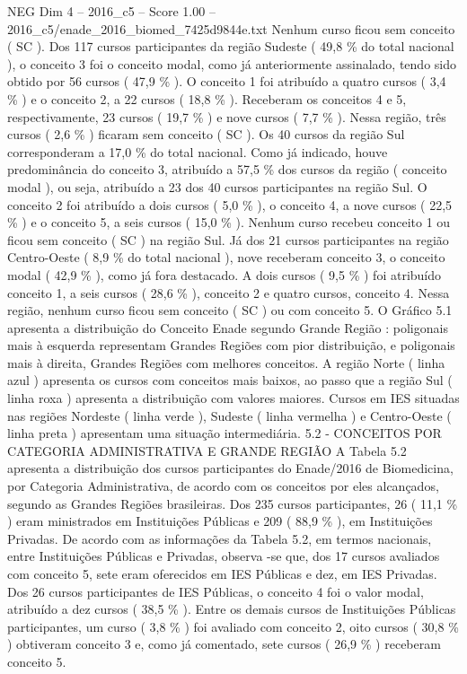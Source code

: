 \begin{textsample}{NEG Dim 4 – 2016\_c5 – Score 1.00 – 2016\_c5/enade\_2016\_biomed\_7425d9844e.txt}
Nenhum curso ficou sem conceito ( SC ).
Dos 117 cursos participantes da região Sudeste ( 49,8 \% do total nacional ), o conceito 3 foi o conceito modal, como já anteriormente assinalado, tendo sido obtido por 56 cursos ( 47,9 \% ).
O conceito 1 foi atribuído a quatro cursos ( 3,4 \% ) e o conceito 2, a 22 cursos ( 18,8 \% ).
Receberam os conceitos 4 e 5, respectivamente, 23 cursos ( 19,7 \% ) e nove cursos ( 7,7 \% ).
Nessa região, três cursos ( 2,6 \% ) ficaram sem conceito ( SC ).
Os 40 cursos da região Sul corresponderam a 17,0 \% do total nacional.
Como já indicado, houve predominância do conceito 3, atribuído a 57,5 \% dos cursos da região ( conceito modal ), ou seja, atribuído a 23 dos 40 cursos participantes na região Sul.
O conceito 2 foi atribuído a dois cursos ( 5,0 \% ), o conceito 4, a nove cursos ( 22,5 \% ) e o conceito 5, a seis cursos ( 15,0 \% ).
Nenhum curso recebeu conceito 1 ou ficou sem conceito ( SC ) na região Sul.
Já dos 21 cursos participantes na região Centro-Oeste ( 8,9 \% do total nacional ), nove receberam conceito 3, o conceito modal ( 42,9 \% ), como já fora destacado.
A dois cursos ( 9,5 \% ) foi atribuído conceito 1, a seis cursos ( 28,6 \% ), conceito 2 e quatro cursos, conceito 4.
Nessa região, nenhum curso ficou sem conceito ( SC ) ou com conceito 5.
O Gráfico 5.1 apresenta a distribuição do Conceito Enade segundo Grande Região : poligonais mais à esquerda representam Grandes Regiões com pior distribuição, e poligonais mais à direita, Grandes Regiões com melhores conceitos.
A região Norte ( linha azul ) apresenta os cursos com conceitos mais baixos, ao passo que a região Sul ( linha roxa ) apresenta a distribuição com valores maiores.
Cursos em IES situadas nas regiões Nordeste ( linha verde ), Sudeste ( linha vermelha ) e Centro-Oeste ( linha preta ) apresentam uma situação intermediária. 5.2 - CONCEITOS POR CATEGORIA ADMINISTRATIVA E GRANDE REGIÃO A Tabela 5.2 apresenta a distribuição dos cursos participantes do Enade/2016 de Biomedicina, por Categoria Administrativa, de acordo com os conceitos por eles alcançados, segundo as Grandes Regiões brasileiras.
Dos 235 cursos participantes, 26 ( 11,1 \% ) eram ministrados em Instituições Públicas e 209 ( 88,9 \% ), em Instituições Privadas.
De acordo com as informações da Tabela 5.2, em termos nacionais, entre Instituições Públicas e Privadas, observa -se que, dos 17 cursos avaliados com conceito 5, sete eram oferecidos em IES Públicas e dez, em IES Privadas.
Dos 26 cursos participantes de IES Públicas, o conceito 4 foi o valor modal, atribuído a dez cursos ( 38,5 \% ).
Entre os demais cursos de Instituições Públicas participantes, um curso ( 3,8 \% ) foi avaliado com conceito 2, oito cursos ( 30,8 \% ) obtiveram conceito 3 e, como já comentado, sete cursos ( 26,9 \% ) receberam conceito 5.

\end{textsample}
